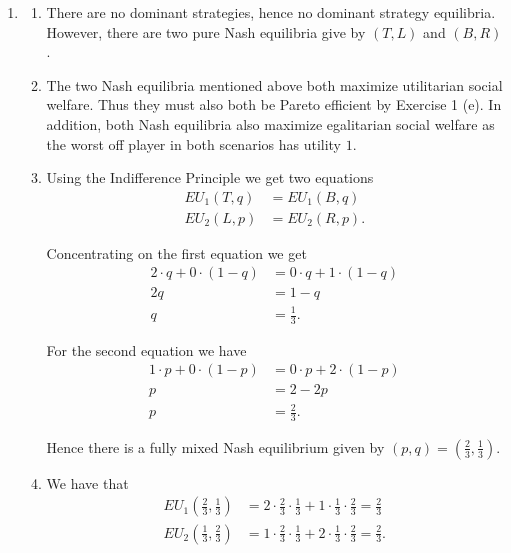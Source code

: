 \documentclass[a4paper]{article}
\begin{document}
\begin{exercise}{3}
  \begin{enumerate}[label=(\alph*)]
    \item
      \begin{enumerate}[label=(\roman*)]
        \item There are no dominant strategies, hence no dominant strategy equilibria. However, there are two pure Nash equilibria give by $ (T, L) $ and $ (B, R) $.

        \item The two Nash equilibria mentioned above both maximize utilitarian social welfare. Thus they must also both be Pareto efficient by Exercise 1 (e). In addition, both Nash equilibria also maximize egalitarian social welfare as the worst off player in both scenarios has utility $ 1 $.

        \item Using the Indifference Principle we get two equations
          \begin{align*}
            EU_1(T, q) &= EU_1(B, q) \\
            EU_2(L, p) &= EU_2(R, p)
          .\end{align*}

          Concentrating on the first equation we get
          \begin{align*}
            2\cdot q + 0 \cdot (1 - q) &= 0 \cdot q + 1 \cdot (1 - q) \\
            2q &= 1 - q \\
            q &= \frac{1}{3}
          .\end{align*}

          For the second equation we have
          \begin{align*}
            1 \cdot p + 0 \cdot (1 - p) &= 0 \cdot p + 2 \cdot(1 - p) \\
            p &= 2 - 2p \\
            p &= \frac{2}{3}
          .\end{align*}

          Hence there is a fully mixed Nash equilibrium given by $ (p, q) = (\frac{2}{3}, \frac{1}{3}) $.

        \item We have that
          \begin{align*}
            EU_1\left(\frac{2}{3}, \frac{1}{3}\right) &= 2\cdot \frac{2}{3} \cdot \frac{1}{3} + 1\cdot \frac{1}{3}\cdot \frac{2}{3} = \frac{2}{3} \\
            EU_2 \left( \frac{1}{3}, \frac{2}{3} \right) &= 1 \cdot \frac{2}{3} \cdot \frac{1}{3} + 2\cdot \frac{1}{3}\cdot \frac{2}{3} = \frac{2}{3}
          .\end{align*}


\end{enumerate}
\end{enumerate}
\end{exercise}
\end{document}
